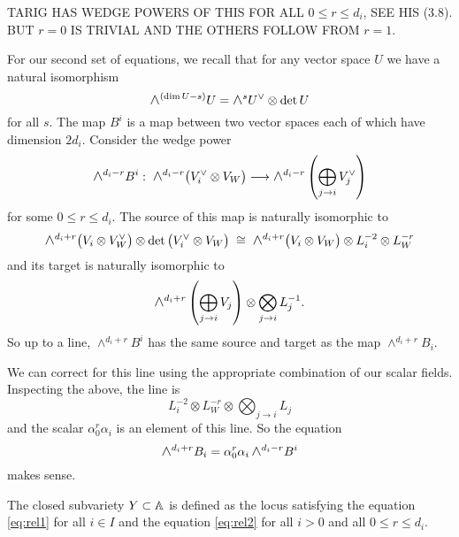 \documentclass{amsart}
\theoremstyle{definition}
\newtheorem{notn}[theorem]{Notation}
\newcommand\pgap{\vspace{10pt}}
\newcommand{\Wedge}{\mbox{\scalebox{1.2}{$\wedge$}}}
\newcommand\VW{V_W}
\newcommand\Y{Y}
\begin{document}
TARIG HAS WEDGE POWERS OF THIS FOR ALL $0\leq r\leq d_i$, SEE HIS (3.8). BUT $r=0$ IS TRIVIAL AND THE OTHERS FOLLOW FROM $r=1$.
 


\pgap

For our second set of equations, we recall that for any vector space $U$ we have a natural isomorphism 
$$\Wedge^{(\dim U -s)} U = \Wedge^s U^\vee \otimes \det U $$
for all $s$.  The map $B^i$ is a map between two vector spaces each of which have dimension $2d_i$. Consider the wedge power
$$\Wedge^{d_i-r} B^i: \; \Wedge^{d_i-r}\big( V_i^\vee\otimes \VW \big) \longrightarrow \Wedge^{d_i-r} \left( \bigoplus_{j\to i} V_j^\vee \right) $$
for some $0\leq r \leq d_i$. The source of this map is naturally isomorphic to
$$ \Wedge^{d_i+r} \big( V_i \otimes \VW^\vee \big) \otimes \det \big( V_i^\vee\otimes \VW \big) \; \cong\; 
  \Wedge^{d_i+r} \big( V_i \otimes \VW \big) \otimes L_i^{-2}\otimes L_W^{-r} $$
and its target is naturally isomorphic to
$$\Wedge^{d_i+r} \left( \bigoplus_{j\to i} V_j \right)\otimes \bigotimes_{j\to i} L_j^{-1}. $$
So up to a line, $\wedge^{d_i+r} B^i$ has the same source and target as the map $\wedge^{d_i+r} B_i$. 

We can correct for this line using the appropriate combination of our scalar fields. Inspecting the above, the line is 
$$ L_i^{-2}\otimes L_W^{-r} \otimes \bigotimes_{j\to i} L_j $$
and the scalar $\alpha_0^r\alpha_i$ is an element of this line. So the equation
\begin{equation}\label{eq:rel2}
\Wedge^{d_i+r} B_i  = \alpha_0^r \alpha_i\, \Wedge^{d_i-r} B^i 
\end{equation}
makes sense.


\begin{definition}\label{def:equa}
The closed subvariety $\Y \subset \bA$ is defined as the locus satisfying the equation \eqref{eq:rel1} for all $i\in I$ and the equation \eqref{eq:rel2} for all $i>0$ and all $0\leq r\leq d_i$.
\end{definition}
\end{document}
